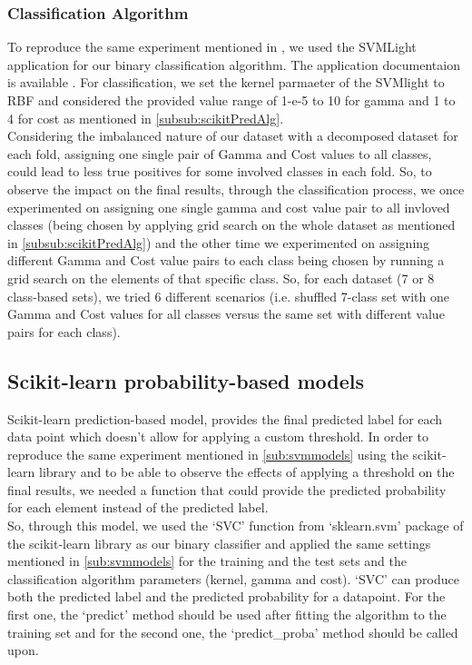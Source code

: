     \subsubsection{Classification Algorithm}
    To reproduce the same experiment mentioned in \cite{mishra2014prediction}, we used the SVMLight application
    for our binary classification algorithm. The application documentaion is available . For classification, 
    we set the kernel parmaeter of the SVMlight to RBF and considered the provided value range of 
    1-e-5 to 10 for gamma and 1 to 4 for cost as mentioned in \ref{subsub:scikitPredAlg}.\\

    Considering the imbalanced nature of our dataset with a decomposed dataset for each fold, 
    assigning one single pair of Gamma and Cost values to all classes, could lead to less true positives 
    for some involved classes in each fold. So, to observe the impact on the final results, through the classification process, 
    we once experimented on assigning one single gamma and cost value pair to all invloved classes (being chosen by applying grid search 
    on the whole dataset as mentioned in \ref{subsub:scikitPredAlg}) and the other time we experimented on assigning 
    different Gamma and Cost value pairs to each class being chosen by running a grid search on the elements of that specific class. 
    So, for each dataset (7 or 8 class-based sets), we tried 6 different scenarios (i.e. shuffled 7-class set with one Gamma and Cost values 
    for all classes versus the same set with different value pairs for each class).\\        
        

\subsection{Scikit-learn probability-based models}
\label{sub:scikitprob}
    Scikit-learn prediction-based model, provides the final predicted label for each data point which doesn't allow for applying 
    a custom threshold. In order to reproduce the same experiment mentioned in \ref{sub:svmmodels} using the scikit-learn library 
    and to be able to observe the effects of applying a threshold on the final results, we needed a function that could provide 
    the predicted probability for each element instead of the predicted label.\\

    So, through this model, we used the `SVC' function from `sklearn.svm' package of the scikit-learn library as our binary 
    classifier and applied the same settings mentioned in \ref{sub:svmmodels} for the training and the test sets and 
    the classification algorithm parameters (kernel, gamma and cost). `SVC' can produce both the predicted label and the predicted 
    probability for a datapoint. For the first one, the `predict' method should be used after fitting the algorithm to the training set 
    and for the second one, the `predict\_proba' method should be called upon.


